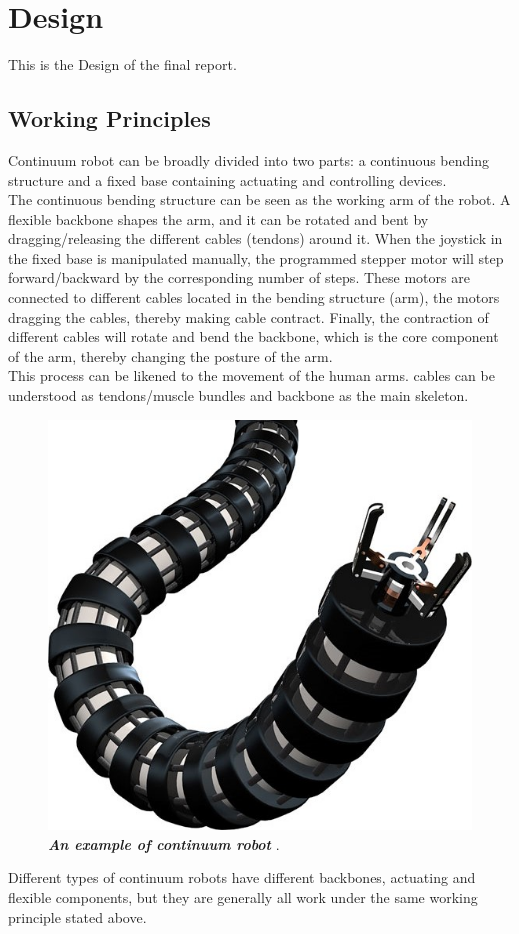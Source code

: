 \section{Design} 
This is the Design of the final report.
\subsection{Working Principles}
Continuum robot can be broadly divided into two parts: a continuous bending structure and a fixed base containing actuating and 
controlling devices.\\
The continuous bending structure can be seen as the working arm of the robot. A flexible backbone shapes the arm, and it can be rotated 
and bent by dragging/releasing the different cables (tendons) around it. 
When the joystick in the fixed base is manipulated manually, the programmed stepper motor will step forward/backward by the 
corresponding number of steps. These motors are connected to different cables located in the bending structure (arm), the motors 
dragging the cables, thereby making cable contract. Finally, the contraction of different cables will rotate and bend the backbone, 
which is the core component of the arm, thereby changing the posture of the arm.\\
This process can be likened to the movement of the human arms. cables can be understood as tendons/muscle bundles and backbone as 
the main skeleton.
\begin{figure}[H] %
    \centering %
    \captionsetup{labelsep=colon}
    \includegraphics[width=.8\textwidth]{Image/LR/CR_example.jpg} 
    \caption[An example of continuum robot]
    {\centering \textit{\textbf{An example of continuum robot }}\cite{CR_example}.}
    \label{fig:CR_example}
\end{figure}
\noindent Different types of continuum robots have different backbones, actuating and flexible components, but they are generally all 
work under the same working principle stated above. \\
